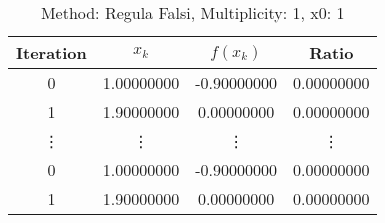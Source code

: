 \begin{table}
\centering
\caption{Method: Regula Falsi, Multiplicity: 1, x0: 1}
\label{tab:table_Regula_Falsi_1_1}
\begin{tabular}{c c c c}
\toprule
Iteration &      $x_k$ &    $f(x_k)$ &      Ratio \\
\midrule
        0 & 1.00000000 & -0.90000000 & 0.00000000 \\
        1 & 1.90000000 &  0.00000000 & 0.00000000 \\
   \vdots &     \vdots &      \vdots &     \vdots \\
        0 & 1.00000000 & -0.90000000 & 0.00000000 \\
        1 & 1.90000000 &  0.00000000 & 0.00000000 \\
\bottomrule
\end{tabular}
\end{table}
